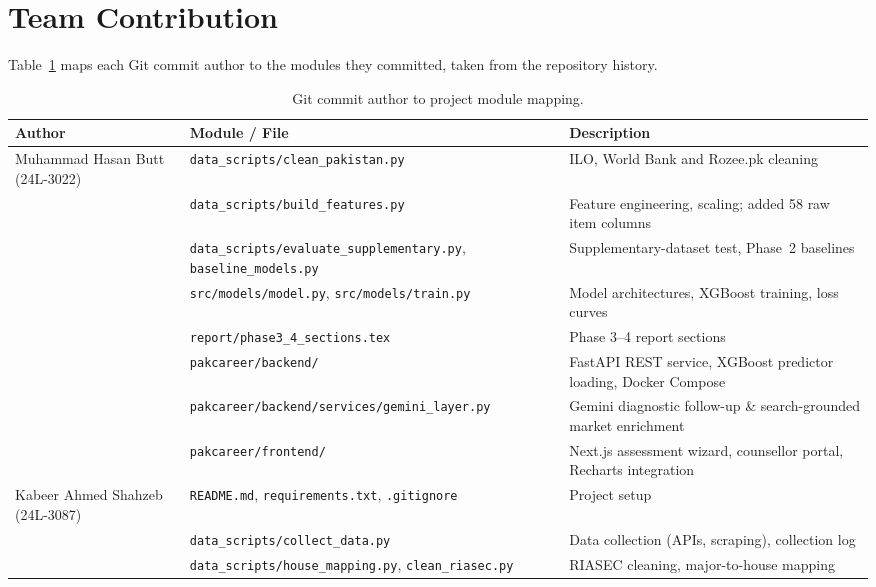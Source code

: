 


\section{Team Contribution}

Table~\ref{tab:contrib} maps each Git commit author to the modules they
committed, taken from the repository history.

\begin{table}[h]
\centering
\small
\caption{Git commit author to project module mapping.}
\label{tab:contrib}
\begin{tabular}{p{3.4cm}p{5.4cm}p{6.2cm}}
\toprule
\textbf{Author} & \textbf{Module / File} & \textbf{Description} \\
\midrule
Muhammad Hasan Butt (24L-3022)
  & \texttt{data\_scripts/clean\_pakistan.py} & ILO, World Bank and Rozee.pk cleaning \\
  & \texttt{data\_scripts/build\_features.py} & Feature engineering, scaling; added 58 raw item columns \\
  & \texttt{data\_scripts/evaluate\_\allowbreak supplementary.py}, \texttt{baseline\_models.py} & Supplementary-dataset test, Phase~2 baselines \\
  & \texttt{src/models/model.py}, \texttt{src/models/train.py} & Model architectures, XGBoost training, loss curves \\
  & \texttt{report/phase3\_4\_sections.tex} & Phase 3--4 report sections \\
  & \texttt{pakcareer/backend/} & FastAPI REST service, XGBoost predictor loading, Docker Compose \\
  & \texttt{pakcareer/backend/\allowbreak services/\allowbreak gemini\_layer.py} & Gemini diagnostic follow-up \& search-grounded market enrichment \\
  & \texttt{pakcareer/frontend/} & Next.js assessment wizard, counsellor portal, Recharts integration \\
\midrule
Kabeer Ahmed Shahzeb (24L-3087)
  & \texttt{README.md}, \texttt{requirements.txt}, \texttt{.gitignore} & Project setup \\
  & \texttt{data\_scripts/collect\_data.py} & Data collection (APIs, scraping), collection log \\
  & \texttt{data\_scripts/house\_mapping.py}, \texttt{clean\_riasec.py} & RIASEC cleaning, major-to-house mapping \\

\end{tabular}
\end{table}

